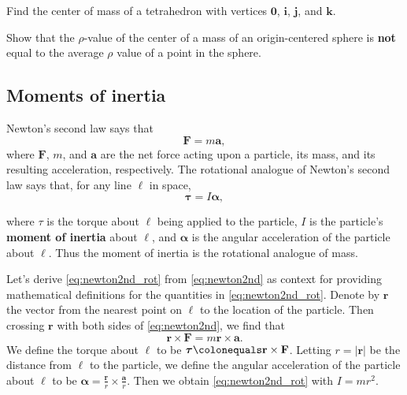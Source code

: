 \documentclass{watsonbook}
\begin{document}
\begin{exercise}{}{}
  Find the center of mass of a tetrahedron with vertices $\mathbf{0}$,
  $\mathbf{i}$, $\mathbf{j}$, and $\mathbf{k}$.
\end{exercise}

\begin{exercise}{}{}
  Show that the $\rho$-value of the center of a mass of an
  origin-centered sphere is \textbf{not} equal to the average $\rho$
  value of a point in the sphere.
\end{exercise}

\subsection{Moments of inertia} \label{sec:moments-inertia}

Newton's second law says that
\begin{equation} \label{eq:newton2nd} 
  \mathbf{F} = m \mathbf{a},
\end{equation}
where $\mathbf{F}$, $m$, and $\mathbf{a}$ are the net force acting
upon a particle, its mass, and its resulting acceleration,
respectively. The rotational analogue of Newton's second law says
that, for any line $\ell$ in space,
\begin{equation} \label{eq:newton2nd_rot} 
  {\bm \tau} = I {\bm \alpha}, 
\end{equation}
\begin{minipage}[t]{0.7\textwidth}
  where $\tau$ is the torque about $\ell$ being applied to the
  particle, $I$ is the particle's \textbf{moment of inertia} about
  $\ell$, and ${\bm \alpha}$ is the angular acceleration of the
  particle about $\ell$. Thus the moment of inertia is the rotational
  analogue of mass.
  
  Let's derive \eqref{eq:newton2nd_rot} from \eqref{eq:newton2nd} as
  context for providing mathematical definitions for the quantities in
  \eqref{eq:newton2nd_rot}. Denote by $\mathbf{r}$ the vector from the
  nearest point on $\ell$ to the location of the particle. Then
  crossing $\mathbf{r}$ with both sides of \eqref{eq:newton2nd}, we
  find that
  \[
    \mathbf{r} \times \mathbf{F} = m \mathbf{r} \times \mathbf{a}. 
  \]
  We define the torque about $\ell$ to be ${\bm \tau} \colonequals
  \mathbf{r} \times \mathbf{F}$. Letting $r = |\mathbf{r}|$ be the
  distance from $\ell$ to the particle, we define the angular
  acceleration of the particle about $\ell$ to be ${\bm \alpha} =
  \frac{\mathbf{r}}{r} \times \frac{\mathbf{a}}{r}$. Then we obtain
  \eqref{eq:newton2nd_rot} with $I = mr^2$.
\end{minipage}
\end{document}
